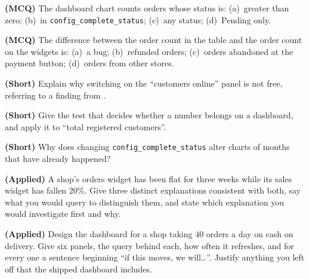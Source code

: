 \begin{reviewq}
  \item \textbf{(MCQ)} The dashboard chart counts orders whose status is:
        (a)~greater than zero; (b)~in \texttt{config\_complete\_status};
        (c)~any status; (d)~Pending only.
  \item \textbf{(MCQ)} The difference between the order count in the table and
        the order count on the widgets is: (a)~a bug; (b)~refunded orders;
        (c)~orders abandoned at the payment button; (d)~orders from other
        stores.
  \item \textbf{(Short)} Explain why switching on the ``customers online''
        panel is not free, referring to a finding from .
  \item \textbf{(Short)} Give the test that decides whether a number belongs on
        a dashboard, and apply it to ``total registered customers''.
  \item \textbf{(Short)} Why does changing \texttt{config\_complete\_status}
        alter charts of months that have already happened?
  \item \textbf{(Applied)} A shop's orders widget has been flat for three weeks
        while its sales widget has fallen 20\%. Give three distinct
        explanations consistent with both, say what you would query to
        distinguish them, and state which explanation you would investigate
        first and why.
  \item \textbf{(Applied)} Design the dashboard for a shop taking 40 orders a
        day on cash on delivery. Give six panels, the query behind each, how
        often it refreshes, and for every one a sentence beginning ``if this
        moves, we will\dots''. Justify anything you left off that the shipped
        dashboard includes.
\end{reviewq}
